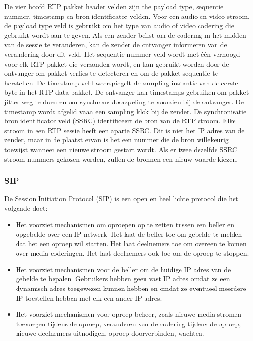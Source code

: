 \clearpage


De vier hoofd RTP pakket header velden zijn the payload type, sequentie nummer, timestamp en bron identificator velden. Voor een audio en video stroom, de payload type veld is gebruikt om het type van audio of video codering die gebruikt wordt aan te geven. Als een zender belist om de codering in het midden van de sessie te veranderen, kan de zender de ontvanger informeren van de verandering door dit veld. 
Het sequentie nummer veld wordt met één verhoogd voor elk RTP pakket die verzonden wordt, en kan gebruikt worden door de ontvanger om pakket verlies te detecteren en om de pakket sequentie te herstellen. 
De timestamp veld weerspiegelt de sampling instantie van de eerste byte in het RTP data pakket. De ontvanger kan timestamps gebruiken om pakket jitter weg te doen en om synchrone doorspeling te voorzien bij de ontvanger. De timestamp wordt afgelid vaan een sampling klok bij de zender.
De synchronisatie bron identificator veld (SSRC) identificeert de bron van de RTP stroom. Elke stroom in een RTP sessie heeft een aparte SSRC. Dit is niet het IP adres van de zender, maar in de plaatst ervan is het een nummer die de bron willekeurig toewijst wanneer een nieuwe stroom gestart wordt. Als er twee dezelfde SSRC stroom nummers gekozen worden, zullen de bronnen een nieuw waarde kiezen.

\subsubsection{SIP}

De Session Initiation Protocol (SIP) is een open en heel lichte protocol die het volgende doet:
\begin{itemize}
\item Het voorziet mechanismen om oproepen op te zetten tussen een beller en opgebelde over een IP netwerk. Het laat de beller toe om gebelde te melden dat het een oproep wil starten. Het laat deelnemers toe om overeen te komen over media coderingen. Het laat deelnemers ook toe om de oproep te stoppen.
\item Het voorziet mechanismen voor de beller om de huidige IP adres van de gebelde te bepalen. Gebruikers hebben geen vast IP adres omdat ze een dynamisch adres toegewezen kunnen hebben en omdat ze eventueel meerdere IP toestellen hebben met elk een ander IP adres.
\item Het voorziet mechanismen voor oproep beheer, zoals nieuwe media stromen toevoegen tijdens de oproep, veranderen van de codering tijdens de oproep, nieuwe deelnemers uitnodigen, oproep doorverbinden, wachten.
\end{itemize}

